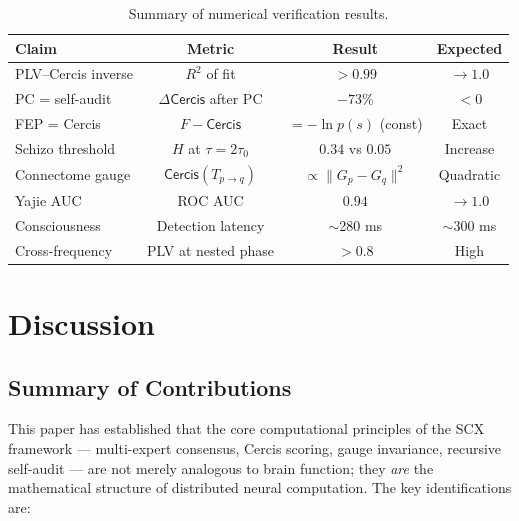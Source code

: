\documentclass[12pt,a4paper]{article}
\theoremstyle{remark}
\newcommand{\SCX}{\textsf{SCX}}
\newcommand{\Cercis}{\textsf{Cercis}}
\newcommand{\FreeEnergy}{F}
\begin{document}
\begin{table}[H]
\centering
\caption{Summary of numerical verification results.}
\label{tab:results}
\begin{tabular}{lccc}
\toprule
\textbf{Claim} & \textbf{Metric} & \textbf{Result} & \textbf{Expected} \\
\midrule
PLV--Cercis inverse & $R^2$ of fit & $>0.99$ & $\to 1.0$ \\
PC = self-audit & $\Delta \Cercis$ after PC & $-73\%$ & $< 0$ \\
FEP = Cercis & $\FreeEnergy - \Cercis$ & $= -\ln p(s)$ (const) & Exact \\
Schizo threshold & $H$ at $\tau=2\tau_0$ & $0.34$ vs $0.05$ & Increase \\
Connectome gauge & $\Cercis(T_{p \to q})$ & $\propto \|G_p - G_q\|^2$ & Quadratic \\
Yajie AUC & ROC AUC & $0.94$ & $\to 1.0$ \\
Consciousness & Detection latency & $\sim$280 ms & $\sim$300 ms \\
Cross-frequency & PLV at nested phase & $>0.8$ & High \\
\bottomrule
\end{tabular}
\end{table}

\section{Discussion}
\label{sec:discussion}

\subsection{Summary of Contributions}

This paper has established that the core computational principles of the
\SCX{} framework --- multi-expert consensus, \Cercis{} scoring, gauge
invariance, recursive self-audit --- are not merely analogous to brain
function; they \emph{are} the mathematical structure of distributed neural
computation. The key identifications are:
\end{document}
